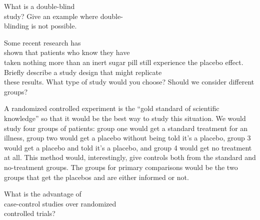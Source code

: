 \documentclass[11pt, chapterprefix=true]{scrbook}\usepackage[]{graphicx}\usepackage[]{color}
\begin{document}
\begin{exercises}
\begin{solution}
	\end{solution}

  \begin{exercise} %

What is a double-blind \\ study?  Give an example where double- \\ blinding is not possible.

    \end{exercise}
% 

  \begin{exercise} %

Some recent research has \\ shown that patients who know they have \\ taken nothing more than an inert sugar pill still experience the placebo effect. Briefly describe a study design that might replicate \\ these results. What type of study would you choose? Should we consider different \\ groups? 
  \end{exercise}
  \begin{solution}  %
  
A randomized controlled experiment is the ``gold standard of scientific knowledge'' so that it would be the best way to study this situation. We would study four groups of patients: group one would get a standard treatment for an illness, group two would get a placebo without being told it's a placebo, group 3 would get a placebo and told it's a placebo, and group 4 would get no treatment at all. This method would, interestingly, give controls both from the standard and no-treatment groups. The groups for primary comparisons would be the two groups that get the placebos and are either informed or not.  

  \end{solution}

  \begin{exercise} %

What is the advantage of \\ case-control studies over randomized \\ controlled trials?

  \end{exercise}
% 


\end{exercises}
\end{document}
